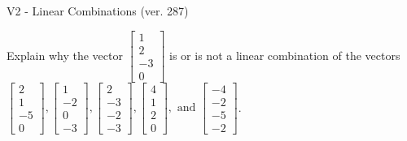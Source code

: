 \begin{exercise}
  \begin{exerciseTitle}V2 - Linear Combinations (ver. 287)\end{exerciseTitle}
  \begin{exerciseStatement}
    Explain why the vector \(\left[\begin{array}{c}
1 \\
2 \\
-3 \\
0
\end{array}\right]\)  is or is not a linear 
	combination of the vectors \(\left[\begin{array}{c}
2 \\
1 \\
-5 \\
0
\end{array}\right] , \left[\begin{array}{c}
1 \\
-2 \\
0 \\
-3
\end{array}\right] , \left[\begin{array}{c}
2 \\
-3 \\
-2 \\
-3
\end{array}\right] , \left[\begin{array}{c}
4 \\
1 \\
2 \\
0
\end{array}\right] , \text{ and } \left[\begin{array}{c}
-4 \\
-2 \\
-5 \\
-2
\end{array}\right]\).
	



\end{exerciseStatement}
\end{exercise}
